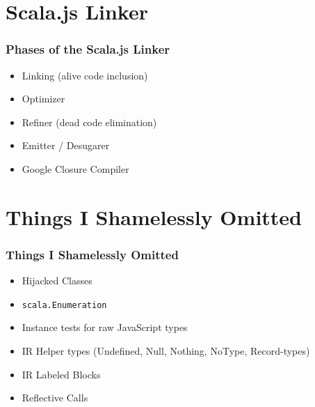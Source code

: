 \documentclass{beamer}
\begin{document}
\section{Scala.js Linker}

\begin{frame}
  \frametitle{Phases of the Scala.js Linker}

  \begin{itemize}
  \item Linking (alive code inclusion)
  \item Optimizer
  \item Refiner (dead code elimination)
  \item Emitter / Desugarer
  \item Google Closure Compiler
  \end{itemize}

\end{frame}

\section*{Things I Shamelessly Omitted}

\begin{frame}
  \frametitle{Things I Shamelessly Omitted}

  \begin{itemize}
  \item Hijacked Classes
  \item \texttt{scala.Enumeration}
  \item Instance tests for raw JavaScript types
  \item IR Helper types (Undefined, Null, Nothing, NoType, Record-types)
  \item IR Labeled Blocks
  \item Reflective Calls
  \end{itemize}
\end{frame}
\end{document}
